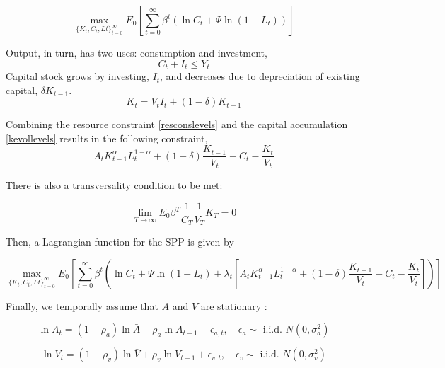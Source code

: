 \documentclass[11pt]{article}
\begin{document}
\[\max_{\{ K_t,C_t,Lt\}_{t=0}^{\infty}} E_0 \left[ \sum_{t=0}^{\infty} \beta^t \left( \ln C_t + \Psi \ln (1-L_t)\right) \right]    \]

Output, in turn, has two uses: consumption and investment,
\begin{equation}\label{resconslevels}
C_t + I_t \leq Y_{t}
\end{equation}
Capital stock grows by investing, $I_t$, and decreases due to depreciation of existing capital, $\delta K_{t-1}$.
\begin{equation}\label{kevollevels}
K_{t} = V_{t} I_t + (1-\delta) K_{t-1}
\end{equation}

Combining the resource constraint \ref{resconslevels} and the capital accumulation \ref{kevollevels} results in the following constraint,
\[ A_t  K^{\alpha}_{t-1} L^{1-\alpha}_{t}  + (1-\delta) \frac{K_{t-1}}{V_t}  -C_t - \frac{K_{t}}{V_t} \]

There is also a transversality condition to be met:

\[ \lim_{T \rightarrow \infty } E_0 \beta^{T} \frac{1}{C_T} \frac{1}{V_T} K_T = 0\]


Then, a  Lagrangian function for the SPP is given by 


\begin{equation}\label{eq:LagrangianSP}
\max_{\{ K_t,C_t,Lt\}_{t=0}^{\infty}}   E_0  \left[ \sum_{t=0}^{\infty} \beta^t \left( \ln C_t + \Psi \ln (1-L_t) +\lambda_t \left[ A_t  K^{\alpha}_{t-1} L^{1-\alpha}_{t}  + (1-\delta) \frac{K_{t-1}}{V_t}  -C_t - \frac{K_{t}}{V_t}  \right]\right)  \right]  
\end{equation}

Finally, we temporally assume that $A$ and $V$ are stationary :

\begin{equation}\label{eq:evo_A}
\ln A_t = (1-\rho_a) \ln \bar{A} + \rho_a \ln A_{t-1} + \epsilon_{a,t}, \quad \epsilon_a \sim \text{ i.i.d. } N(0,\sigma_a^2)  
\end{equation} 

\begin{equation}\label{eq:evo_V}
\ln V_t = (1-\rho_v)\ln \bar{V} + \rho_v \ln V_{t-1} + \epsilon_{v,t}, \quad \epsilon_v \sim \text{ i.i.d. } N(0,\sigma_v^2)  
\end{equation} 
\end{document}

